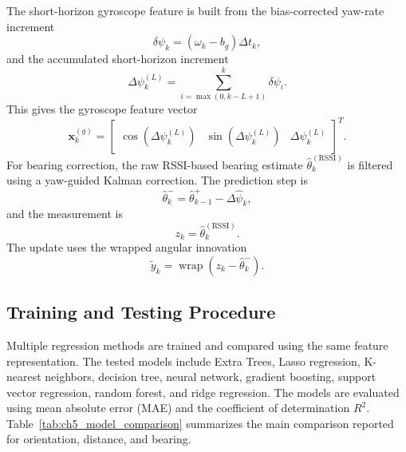 \documentclass{uhcoethesis}
\begin{document}
The short-horizon gyroscope feature is built from the bias-corrected yaw-rate increment
\begin{equation}
    \delta\psi_k=(\omega_k-b_g)\Delta t_k,
    \label{eq:ch5_delta_psi}
\end{equation}
and the accumulated short-horizon increment
\begin{equation}
    \Delta\psi_k^{(L)}
    =
    \sum_{i=\max(0,k-L+1)}^{k}\delta\psi_i.
    \label{eq:ch5_short_horizon_gyro}
\end{equation}
This gives the gyroscope feature vector
\begin{equation}
    \mathbf{x}^{(g)}_k =
    \begin{bmatrix}
    \cos(\Delta\psi_k^{(L)}) &
    \sin(\Delta\psi_k^{(L)}) &
    \Delta\psi_k^{(L)}
    \end{bmatrix}^{T}.
    \label{eq:ch5_gyro_features}
\end{equation}
For bearing correction, the raw RSSI-based bearing estimate $\hat{\theta}_k^{(\mathrm{RSSI})}$ is filtered using a yaw-guided Kalman correction. The prediction step is
\begin{equation}
    \hat{\theta}_k^{-}
    =
    \hat{\theta}_{k-1}^{+}
    -
    \Delta\hat{\psi}_k,
    \label{eq:ch5_theta_prediction}
\end{equation}
and the measurement is
\begin{equation}
    z_k=\hat{\theta}_k^{(\mathrm{RSSI})}.
    \label{eq:ch5_theta_measurement}
\end{equation}
The update uses the wrapped angular innovation
\begin{equation}
    \tilde{y}_k =
    \operatorname{wrap}(z_k-\hat{\theta}_k^{-}).
    \label{eq:ch5_wrapped_innovation}
\end{equation}

\subsection{Training and Testing Procedure}

Multiple regression methods are trained and compared using the same feature representation. The tested models include Extra Trees, Lasso regression, K-nearest neighbors, decision tree, neural network, gradient boosting, support vector regression, random forest, and ridge regression. The models are evaluated using mean absolute error (MAE) and the coefficient of determination $R^2$. Table~\ref{tab:ch5_model_comparison} summarizes the main comparison reported for orientation, distance, and bearing.
\end{document}
